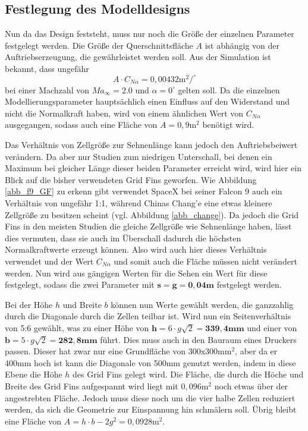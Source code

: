 \subsection{Festlegung des Modelldesigns}\label{sec:modelldesign}
Nun da das Design feststeht, muss nur noch die Größe der einzelnen Parameter festgelegt werden. Die Größe der Querschnittsfläche $A$ ist abhängig von der Auftriebserzeugung, die gewährleistet werden soll. Aus der Simulation ist bekannt, dass ungefähr
\begin{equation}
	A \cdot C_{N\alpha}= 0,00432 \mathrm{m}^2/^\circ
\end{equation}
bei einer Machzahl von $Ma_\infty = 2.0$ und $\alpha = 0^\circ$ gelten soll. Da die einzelnen Modellierungsparameter hauptsächlich einen Einfluss auf den Widerstand und nicht die Normalkraft haben, wird von einem ähnlichen Wert von $C_{N\alpha}$ ausgegangen, sodass auch eine Fläche von $A=0,9\mathrm{m}^2$ benötigt wird.

Das Verhältnis von Zellgröße zur Sehnenlänge kann jedoch den Auftriebsbeiwert verändern. Da aber nur Studien zum niedrigen Unterschall, bei denen ein Maximum bei gleicher Länge dieser beiden Parameter erreicht wird, wird hier ein Blick auf die bisher verwendeten Grid Fins geworfen. Wie Abbildung \ref{abb_f9_GF} zu erkenn gibt verwendet SpaceX bei seiner Falcon 9 auch ein Verhältnis von ungefähr 1:1, während Chinas Chang'e eine etwas kleinere Zellgröße zu besitzen scheint (vgl. Abbildung \ref{abb_change}). Da jedoch die Grid Fins in den meisten Studien die gleiche Zellgröße wie Sehnenlänge haben, lässt dies vermuten, dass sie auch im Überschall dadurch die höchsten Normalkraftwerte erzeugt können. Also wird auch hier dieses Verhältnis verwendet und der Wert $C_{N\alpha}$ und somit auch die Fläche müssen nicht verändert werden. Nun wird aus gängigen Werten für die Sehen ein Wert für diese festgelegt, sodass die zwei Parameter mit $\mathbf{s=g=0,04m}$ festgelegt werden.

Bei der Höhe $h$ und Breite $b$ können nun Werte gewählt werden, die ganzzahlig durch die Diagonale durch die Zellen teilbar ist. Wird nun ein Seitenverhältnis von 5:6 gewählt, was zu einer Höhe von $\mathbf{h= }6\cdot g\sqrt{2}=\mathbf{339,4mm}$ und einer von $\mathbf{b= }5\cdot g\sqrt{2}=\mathbf{282,8mm}$ führt. Dies muss auch in den Bauraum eines Druckers passen. Dieser hat zwar nur eine Grundfläche von 300x300mm$^2$, aber da er 400mm hoch ist kann die Diagonale von 500mm genutzt werden, indem in diese Ebene die Höhe $h$ des Grid Fins gelegt wird. Die Fläche, die durch die Höche und Breite des Grid Fins aufgespannt wird liegt mit $0,096\mathrm{m}^2$ noch etwas über der angestrebten Fläche. Jedoch muss diese noch um die vier halbe Zellen reduziert werden, da sich die Geometrie zur Einspannung hin schmälern soll. Übrig bleibt eine Fläche von $A=h\cdot b-2g^2=0,0928\mathrm{m}^2$.

